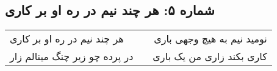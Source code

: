 \begin{center}
\section*{شماره ۵: هر چند نیم در ره او بر کاری}
\label{sec:005}
\begin{longtable}{l p{0.5cm} r}
هر چند نیم در ره او بر کاری
&&
نومید نیم به هیچ وجهی باری
\\
در پرده چو زیر چنگ مینالم زار
&&
کاری بکند زاری من یک باری
\\
\end{longtable}
\end{center}

